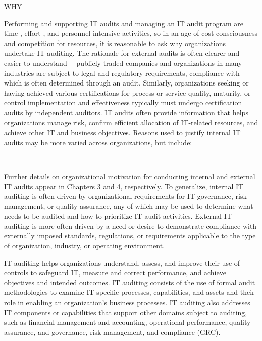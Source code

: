 WHY

Performing and supporting IT audits and managing an IT audit program are time-,
effort-, and personnel-intensive activities, so in an age of cost-consciousness and
competition for resources, it is reasonable to ask why organizations undertake IT
auditing. The rationale for external audits is often clearer and easier to understand—
publicly traded companies and organizations in many industries are subject to legal
and regulatory requirements, compliance with which is often determined through an
audit. Similarly, organizations seeking or having achieved various certifications for
process or service quality, maturity, or control implementation and effectiveness typically must undergo certification audits by independent auditors. IT audits often provide information that helps organizations manage risk, confirm efficient allocation of
IT-related resources, and achieve other IT and business objectives. Reasons used to
justify internal IT audits may be more varied across organizations, but include:

- 
- 

Further details on organizational motivation for conducting internal and external IT audits appear in Chapters  3 and 4, respectively. To generalize, internal IT
auditing is often driven by organizational requirements for IT governance, risk
management, or quality assurance, any of which may be used to determine what
needs to be audited and how to prioritize IT audit activities. External IT auditing
is more often driven by a need or desire to demonstrate compliance with externally
imposed standards, regulations, or requirements applicable to the type of organization, industry, or operating environment.

IT auditing helps organizations understand, assess, and improve
their use of controls to safeguard IT, measure and correct performance, and achieve
objectives and intended outcomes. IT auditing consists of the use of formal audit
methodologies to examine IT-specific processes, capabilities, and assets and their
role in enabling an organization’s business processes. IT auditing also addresses IT
components or capabilities that support other domains subject to auditing, such as
financial management and accounting, operational performance, quality assurance,
and governance, risk management, and compliance (GRC).


